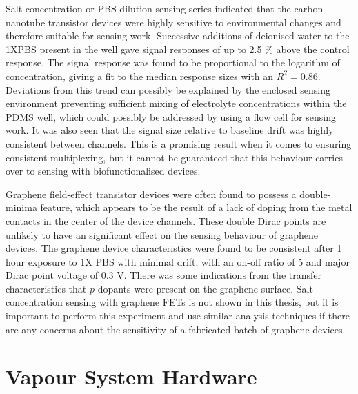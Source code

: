 \documentclass[
  a4paper,
]{scrbook}
\begin{document}
Salt concentration or PBS dilution sensing series indicated that the
carbon nanotube transistor devices were highly sensitive to
environmental changes and therefore suitable for sensing work.
Successive additions of deionised water to the 1XPBS present in the well
gave signal responses of up to 2.5 \% above the control response. The
signal response was found to be proportional to the logarithm of
concentration, giving a fit to the median response sizes with an
\(R^2 = 0.86\). Deviations from this trend can possibly be explained by
the enclosed sensing environment preventing sufficient mixing of
electrolyte concentrations within the PDMS well, which could possibly be
addressed by using a flow cell for sensing work. It was also seen that
the signal size relative to baseline drift was highly consistent between
channels. This is a promising result when it comes to ensuring
consistent multiplexing, but it cannot be guaranteed that this behaviour
carries over to sensing with biofunctionalised devices.

Graphene field-effect transistor devices were often found to possess a
double-minima feature, which appears to be the result of a lack of
doping from the metal contacts in the center of the device channels.
These double Dirac points are unlikely to have an significant effect on
the sensing behaviour of graphene devices. The graphene device
characteristics were found to be consistent after 1 hour exposure to 1X
PBS with minimal drift, with an on-off ratio of 5 and major Dirac point
voltage of 0.3 V. There was some indications from the transfer
characteristics that \(p\)-dopants were present on the graphene surface.
Salt concentration sensing with graphene FETs is not shown in this
thesis, but it is important to perform this experiment and use similar
analysis techniques if there are any concerns about the sensitivity of a
fabricated batch of graphene devices.

\cleardoublepage
{}
{}
\appendix

\hypertarget{sec-vapour-sensor-components}{%
\chapter{Vapour System Hardware}\label{sec-vapour-sensor-components}}
\end{document}
